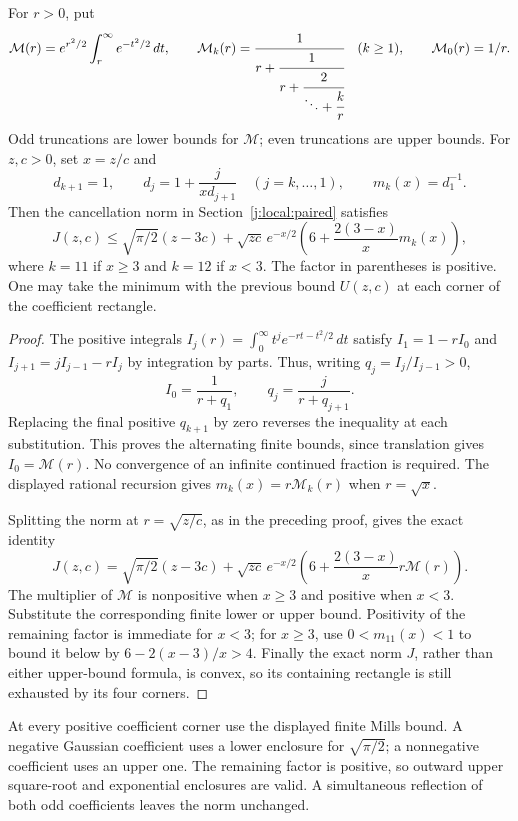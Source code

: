 \begin{lemma}\label{j:local:entry189:mills}
For $r>0$, put
\[
 \mathcal M(r)=e^{r^2/2}\int_r^\infty e^{-t^2/2}\,dt,
 \qquad
 \mathcal M_k(r)=\cfrac1{r+\cfrac1{r+\cfrac2{\ddots+\cfrac{k}{r}}}}
 \quad(k\ge1),\qquad \mathcal M_0(r)=1/r.
\]
Odd truncations are lower bounds for $\mathcal M$; even truncations
are upper bounds. For $z,c>0$, set $x=z/c$ and
\[
 d_{k+1}=1,\qquad d_j=1+\frac j{xd_{j+1}}\quad(j=k,\ldots,1),
 \qquad m_k(x)=d_1^{-1}.
\]
Then the cancellation norm in Section~\ref{j:local:paired}
satisfies
\begin{equation}\label{j:local:entry189:mills-bound}
 J(z,c)\le \sqrt{\pi/2}(z-3c)+\sqrt{zc}\,e^{-x/2}
 \left(6+\frac{2(3-x)}x m_k(x)\right),
\end{equation}
where $k=11$ if $x\ge3$ and $k=12$ if $x<3$.
The factor in parentheses is positive. One may take the minimum with
the previous bound $U(z,c)$ at each corner of the coefficient rectangle.
\end{lemma}
\begin{proof}
The positive integrals
$I_j(r)=\int_0^\infty t^j e^{-rt-t^2/2}\,dt$ satisfy
$I_1=1-rI_0$ and $I_{j+1}=jI_{j-1}-rI_j$ by integration by parts.
Thus, writing $q_j=I_j/I_{j-1}>0$,
\[
 I_0=\frac1{r+q_1},\qquad q_j=\frac j{r+q_{j+1}}.
\]
Replacing the final positive $q_{k+1}$ by zero reverses the inequality
at each substitution. This proves the alternating finite bounds, since
translation gives $I_0=\mathcal M(r)$. No convergence of an infinite
continued fraction is required. The displayed rational recursion gives
$m_k(x)=r\mathcal M_k(r)$ when $r=\sqrt x$.

Splitting the norm at $r=\sqrt{z/c}$, as in the preceding proof, gives
the exact identity
\[
 J(z,c)=\sqrt{\pi/2}(z-3c)+\sqrt{zc}\,e^{-x/2}
 \left(6+\frac{2(3-x)}x r\mathcal M(r)\right).
\]
The multiplier of $\mathcal M$ is nonpositive when $x\ge3$ and
positive when $x<3$. Substitute the corresponding finite lower or
upper bound. Positivity of the remaining factor is immediate for
$x<3$; for $x\ge3$, use $0<m_{11}(x)<1$ to bound it below by
$6-2(x-3)/x>4$. Finally the exact norm $J$, rather than either
upper-bound formula, is convex, so its containing rectangle is still
exhausted by its four corners.
\end{proof}

At every positive coefficient corner use the displayed finite Mills bound.
A negative Gaussian coefficient uses a lower enclosure for
$\sqrt{\pi/2}$; a nonnegative coefficient uses an upper one. The remaining
factor is positive, so outward upper square-root and exponential enclosures
are valid. A simultaneous reflection of both odd coefficients leaves the
norm unchanged.

